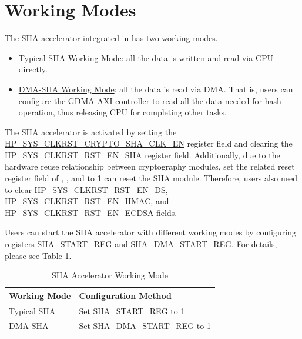 \documentclass[main\_\_EN.tex]{subfiles}
\begin{document}
\section{Working Modes}
The SHA accelerator integrated in \chipname{} has two working modes.

\begin{itemize}
    \item \hyperref[sec:sha-typical-sha]{Typical SHA Working Mode}: all the data is written and read via CPU directly.
    \item \hyperref[sec:sha-dma-sha]{DMA-SHA Working Mode}: all the data is read via DMA. That is, users can configure the GDMA-AXI controller to read all the data needed for hash operation, thus releasing CPU for completing other tasks.
\end{itemize}

The SHA accelerator is activated by setting the \hyperref[fielddesc:HPSYSCLKRSTCRYPTOSHACLKEN]{HP\_SYS\_CLKRST\_CRYPTO\_SHA\_CLK\_EN} register field and clearing the \hyperref[fielddesc:HPSYSCLKRSTRSTENSHA]{HP\_SYS\_CLKRST\_RST\_EN\_SHA} register field. Additionally, due to the hardware reuse relationship between cryptography modules, set the related reset register field of , , and  to 1 can reset the SHA module. Therefore, users also need to clear \hyperref[fielddesc:HPSYSCLKRSTRSTENDS]{HP\_SYS\_CLKRST\_RST\_EN\_DS}, \hyperref[fielddesc:HPSYSCLKRSTRSTENHMAC]{HP\_SYS\_CLKRST\_RST\_EN\_HMAC}, and \hyperref[fielddesc:HPSYSCLKRSTRSTENECDSA]{HP\_SYS\_CLKRST\_RST\_EN\_ECDSA} fields.

Users can start the SHA accelerator with different working modes by configuring registers \hyperref[regdesc:SHASTARTREG]{SHA\_START\_REG} and \hyperref[regdesc:SHADMASTARTREG]{SHA\_DMA\_START\_REG}. For details, please see Table \ref{tab:sha-hash-algo-select}.

\begin{longtable}[c]{ | l | l | }
\caption{SHA Accelerator Working Mode}
\label{tab:sha-hash-algo-select}
\\\hline
\rowcolor{lightgray}
\textbf{Working Mode}      & \textbf{Configuration Method}\\
    \hline
    \hyperref[sec:sha-typical-sha]{Typical SHA}      &  Set \hyperref[regdesc:SHASTARTREG]{SHA\_START\_REG} to 1   \\
    \hline
    \hyperref[sec:sha-dma-sha]{DMA-SHA}           &  Set \hyperref[regdesc:SHADMASTARTREG]{SHA\_DMA\_START\_REG} to 1   \\
    \hline
\end{longtable}
\end{document}
